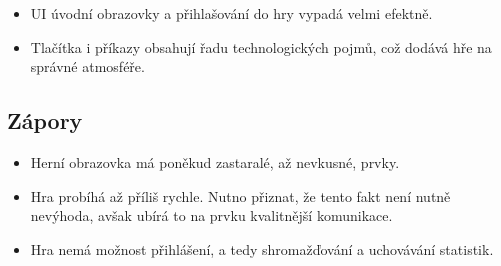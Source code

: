 \begin{itemize}
    \item UI úvodní obrazovky a přihlašování do hry vypadá velmi efektně.
    \item Tlačítka i příkazy obsahují řadu technologických pojmů,
což dodává hře na správné atmosféře.
\end{itemize}

\subsection*{Zápory}

\begin{itemize}
    \item Herní obrazovka má poněkud zastaralé, až nevkusné, prvky.
    \item Hra probíhá až příliš rychle.
Nutno přiznat, že tento fakt není nutně nevýhoda,
avšak ubírá to na prvku kvalitnější komunikace.
    \item Hra nemá možnost přihlášení,
a tedy shromažďování a uchovávání statistik.
\end{itemize}
